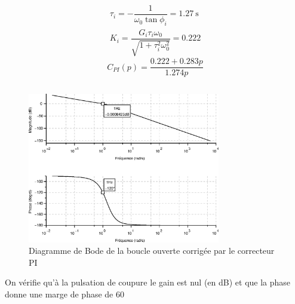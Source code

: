 \begin{align*}
    \tau_i=-\dfrac{1}{\omega_0\tan\phi_i}=\SI{1.27}{\second}\\
    K_i=\dfrac{G_i\tau_i\omega_0}{\sqrt{1+\tau^2_i\omega^2_0}}=0.222
\end{align*}
\[
    C_{PI}(p)=\dfrac{0.222 + 0.283p}{1.274p}
\]
\inputminted{scilab}{codes/scilab/code_q13_chap_correction.sce}
\begin{figure}
    \centering
    \includegraphics[width=0.75\textwidth]{fig/chap_correction/bode_BOCPI.eps}
    \caption{Diagramme de Bode de la boucle ouverte corrigée par 
    le correcteur PI}
\end{figure}
On vérifie qu'à la pulsation de coupure le gain est nul (en \si{\dB}) et
que la phase donne une marge de phase de \SI{60}{\degreeSI}
